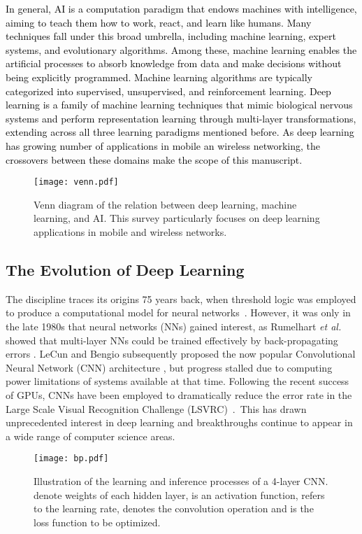 \documentclass[journal,comsoc,letter]{IEEEtran}
\newcommand{\rev}[1]{\textcolor{black}{#1}}
\begin{document}
\rev{In general, AI is a computation paradigm that endows machines with intelligence, aiming to teach them how to work, react, and learn like humans. Many techniques fall under this broad umbrella, including machine learning, expert systems, and evolutionary algorithms. Among these, machine learning enables the artificial processes to absorb knowledge from data and make decisions without being explicitly programmed. Machine learning algorithms are typically categorized into supervised, unsupervised, and reinforcement learning. Deep learning is a family of machine learning techniques that mimic biological nervous systems and perform representation learning through multi-layer transformations, extending across all three learning paradigms mentioned before. As deep learning has growing number of applications in mobile an wireless networking, the crossovers between these domains make the scope of this manuscript.}
\begin{figure}[htb]
\begin{center}
\texttt{[image: venn.pdf]}
\end{center}
\caption{\label{fig:venn} Venn diagram of the relation between deep learning, machine learning, and AI. This survey particularly focuses on deep learning applications in mobile and wireless networks.}
\end{figure}
\subsection{The Evolution of Deep Learning}
The discipline traces its origins 75 years back, when threshold logic was employed to produce a computational model for neural networks~\cite{mcculloch:1943}. However, it was only in the late 1980s that neural networks (NNs) gained interest, as Rumelhart \emph{et al.} showed that multi-layer NNs could be trained effectively by back-propagating errors \cite{williams1986learning}. LeCun and Bengio subsequently proposed the now popular Convolutional Neural Network (CNN) architecture \cite{lecun1995convolutional}, but progress stalled due to computing power limitations of systems available at that time. Following the recent success of GPUs, CNNs have been employed to dramatically reduce the error rate in the Large Scale Visual Recognition Challenge (LSVRC)~\cite{krizhevsky2012imagenet}.~This has drawn unprecedented interest in deep learning and breakthroughs continue to appear in a wide range of computer science areas.
 
\begin{figure}[b]
\begin{center}
\texttt{[image: bp.pdf]}
\end{center}
\caption{\label{fig:bp} Illustration of the learning and inference processes of a 4-layer CNN.  denote weights of each hidden layer,  is an activation function,  refers to the learning rate,  denotes the convolution operation and  is the loss function to be optimized.}
\end{figure}
\end{document}
